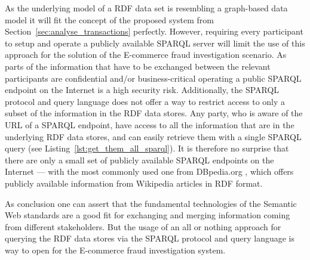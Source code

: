 As the underlying model of a \gls{RDF} data set is resembling a graph-based data model it will fit the concept of the proposed system from Section~\ref{sec:analyse_transactions} perfectly. However, requiring every participant to setup and operate a publicly available \gls{SPARQL} server will limit the use of this approach for the solution of the \gls{E-commerce} fraud investigation scenario. As parts of the information that have to be exchanged between the relevant participants are confidential and/or business-critical operating a public \gls{SPARQL} endpoint on the Internet is a high security risk. Additionally, the \gls{SPARQL} protocol and query language does not offer a way to restrict access to only a subset of the information in the \gls{RDF} data stores. Any party, who is aware of the \gls{URL} of a \gls{SPARQL} endpoint, have access to all the information that are in the underlying \gls{RDF} data stores, and can easily retrieve them with a single \gls{SPARQL} query (see Listing~\ref{lst:get_them_all_sparql}). It is therefore no surprise that there are only a small set of publicly available \gls{SPARQL} endpoints on the Internet --- with the most commonly used one from DBpedia.org \citep{dbPedia.org}, which offers publicly available information from Wikipedia articles in \gls{RDF} format. \\


As conclusion one can assert that the fundamental technologies of the Semantic Web standards are a good fit for exchanging and merging information coming from different stakeholders. But the usage of an all or nothing approach for querying the \gls{RDF} data stores via the \gls{SPARQL} protocol and query language is way to open for the \gls{E-commerce} fraud investigation system.


